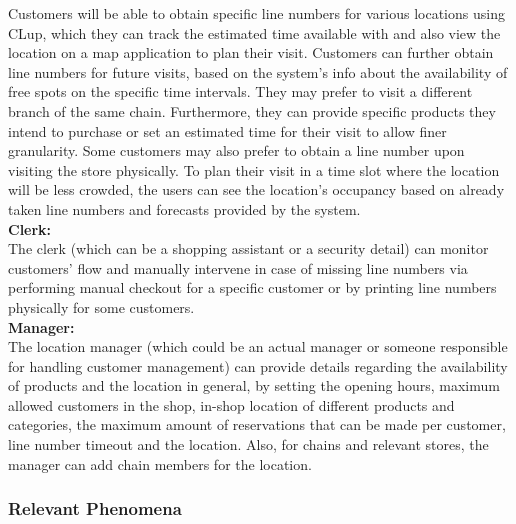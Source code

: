 Customers will be able to obtain specific line numbers for various locations using CLup, which they can track the estimated time available with and also view the location on a map application to plan their visit.
Customers can further obtain line numbers for future visits, based on the system's info about the availability of free spots on the specific time intervals.
They may prefer to visit a different branch of the same chain.
Furthermore, they can provide specific products they intend to purchase or set an estimated time for their visit to allow finer granularity.
Some customers may also prefer to obtain a line number upon visiting the store physically.
To plan their visit in a time slot where the location will be less crowded, the users can see the location's occupancy based on already taken line numbers and forecasts provided by the system.
\\[0.5cm]
\textbf{Clerk:} \\
The clerk (which can be a shopping assistant or a security detail) can monitor customers' flow and manually intervene in case of missing line numbers via performing manual checkout for a specific customer or by printing line numbers physically for some customers.
\\[0.5cm]
\textbf{Manager:} \\

The location manager (which could be an actual manager or someone responsible for handling customer management) can provide details regarding the availability of products and the location in general, by setting the opening hours, maximum allowed customers in the shop, in-shop location of different products and categories, the maximum amount of reservations that can be made per customer, line number timeout and the location.
Also, for chains and relevant stores, the manager can add chain members for the location.

\subsubsection{Relevant Phenomena}

